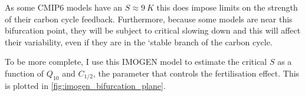 As some CMIP6 models have an $S \approx\SI{9}{K}$ this does impose limits on the strength of their carbon cycle feedback. Furthermore, because some models are
near this bifurcation point, they will be subject to critical slowing down and this will affect their variability, even if they are in the `stable branch of the carbon cycle.
%

To be more complete, I use this IMOGEN model to estimate the critical $S$ as a function of $Q_{10}$ and $C_{1/2}$, the parameter that controls the  fertilisation effect. This
is plotted in \cref{fig:imogen_bifurcation_plane}.

